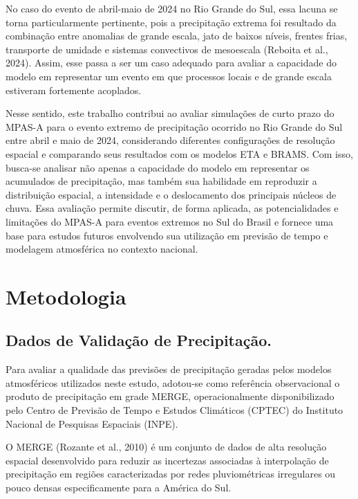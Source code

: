 \documentclass[12pt,a4paper,oneside]{book}
\begin{document}
No caso do evento de abril-maio de 2024 no Rio Grande do Sul, essa lacuna se torna particularmente pertinente, pois a precipitação extrema foi resultado da combinação entre anomalias de grande escala, jato de baixos níveis, frentes frias, transporte de umidade e sistemas convectivos de mesoescala (Reboita et al., 2024). Assim, esse passa a ser um caso adequado para avaliar a capacidade do modelo em representar um evento em que processos locais e de grande escala estiveram fortemente acoplados.

Nesse sentido, este trabalho contribui ao avaliar simulações de curto prazo do MPAS-A para o evento extremo de precipitação ocorrido no Rio Grande do Sul entre abril e maio de 2024, considerando diferentes configurações de resolução espacial e comparando seus resultados com os modelos ETA e BRAMS. Com isso, busca-se analisar não apenas a capacidade do modelo em representar os acumulados de precipitação, mas também sua habilidade em reproduzir a distribuição espacial, a intensidade e o deslocamento dos principais núcleos de chuva. Essa avaliação permite discutir, de forma aplicada, as potencialidades e limitações do MPAS-A para eventos extremos no Sul do Brasil e fornece uma base para estudos futuros envolvendo sua utilização em previsão de tempo e modelagem atmosférica no contexto nacional.

\chapter{Metodologia}

\section{Dados de Validação de Precipitação.}

Para avaliar a qualidade das previsões de precipitação geradas pelos modelos atmosféricos utilizados neste estudo, adotou-se como referência observacional o produto de precipitação em grade MERGE, operacionalmente disponibilizado pelo Centro de Previsão de Tempo e Estudos Climáticos (CPTEC) do Instituto Nacional de Pesquisas Espaciais (INPE).

O MERGE (Rozante et al., 2010) é um conjunto de dados de alta resolução espacial desenvolvido para reduzir as incertezas associadas à interpolação de precipitação em regiões caracterizadas por redes pluviométricas irregulares ou pouco densas especificamente para a América do Sul.
\end{document}
